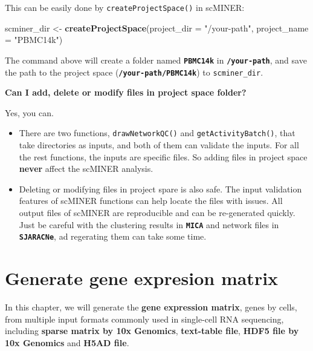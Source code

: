 \documentclass[
  12pt,
]{book}
\newenvironment{Shaded}{\begin{snugshade}}{\end{snugshade}}
\newcommand{\AttributeTok}[1]{\textcolor[rgb]{0.13,0.29,0.53}{#1}}
\newcommand{\FunctionTok}[1]{\textcolor[rgb]{0.13,0.29,0.53}{\textbf{#1}}}
\newcommand{\NormalTok}[1]{#1}
\newcommand{\OtherTok}[1]{\textcolor[rgb]{0.56,0.35,0.01}{#1}}
\newcommand{\StringTok}[1]{\textcolor[rgb]{0.31,0.60,0.02}{#1}}
\providecommand{\tightlist}{%
  \setlength{\itemsep}{0pt}\setlength{\parskip}{0pt}}
\begin{document}
This can be easily done by \texttt{createProjectSpace()} in scMINER:

\begin{Shaded}
\begin{Highlighting}[]
\NormalTok{scminer\_dir }\OtherTok{\textless{}{-}} \FunctionTok{createProjectSpace}\NormalTok{(}\AttributeTok{project\_dir =} \StringTok{"/your{-}path"}\NormalTok{, }\AttributeTok{project\_name =} \StringTok{"PBMC14k"}\NormalTok{)}
\end{Highlighting}
\end{Shaded}

The command above will create a folder named \textbf{\texttt{PBMC14k}} in \textbf{\texttt{/your-path}}, and save the path to the project space (\textbf{\texttt{/your-path/PBMC14k}}) to \texttt{scminer\_dir}.

\textbf{Can I add, delete or modify files in project space folder?}

Yes, you can.

\begin{itemize}
\tightlist
\item
  There are two functions, \texttt{drawNetworkQC()} and \texttt{getActivityBatch()}, that take directories as inputs, and both of them can validate the inputs. For all the rest functions, the inputs are specific files. So adding files in project space \textbf{never} affect the scMINER analysis.
\item
  Deleting or modifying files in project spare is also safe. The input validation features of scMINER functions can help locate the files with issues. All output files of scMINER are reproducible and can be re-generated quickly. Just be careful with the clustering results in \textbf{\texttt{MICA}} and network files in \textbf{\texttt{SJARACNe}}, ad regerating them can take some time.
\end{itemize}

\hfill\break

\chapter{Generate gene expresion matrix}\label{generate-gene-expresion-matrix}

In this chapter, we will generate the \textbf{gene expression matrix}, genes by cells, from multiple input formats commonly used in single-cell RNA sequencing, including \textbf{sparse matrix by 10x Genomics}, \textbf{text-table file}, \textbf{HDF5 file by 10x Genomics} and \textbf{H5AD file}.
\end{document}

